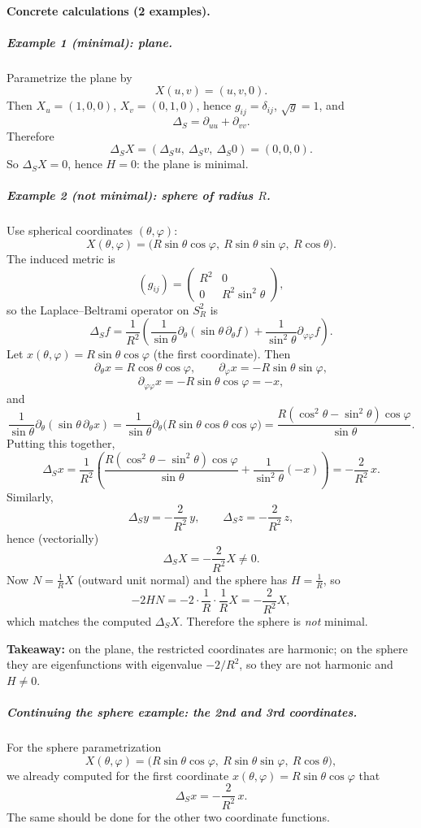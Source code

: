 \documentclass[12pt,a4paper]{article}
\theoremstyle{plain}
\theoremstyle{definition}      %
\begin{document}
\bigskip
\paragraph{Concrete calculations (2 examples).}

\subparagraph{Example 1 (minimal): plane.}
Parametrize the plane by
\[
X(u,v)=(u,v,0).
\]
Then $X_u=(1,0,0)$, $X_v=(0,1,0)$, hence $g_{ij}=\delta_{ij}$, $\sqrt{g}=1$, and
\[
\Delta_S=\partial_{uu}+\partial_{vv}.
\]
Therefore
\[
\Delta_S X = (\Delta_S u,\ \Delta_S v,\ \Delta_S 0)=(0,0,0).
\]
So $\Delta_S X=0$, hence $H=0$: the plane is minimal.

\subparagraph{Example 2 (not minimal): sphere of radius $R$.}
Use spherical coordinates $(\theta,\varphi)$:
\[
X(\theta,\varphi)=\bigl(R\sin\theta\cos\varphi,\ R\sin\theta\sin\varphi,\ R\cos\theta\bigr).
\]
The induced metric is
\[
(g_{ij})=\begin{pmatrix}R^2&0\\[2pt]0&R^2\sin^2\theta\end{pmatrix},
\]
so the Laplace--Beltrami operator on $S_R^2$ is
\[
\Delta_S f=\frac{1}{R^2}\left(\frac{1}{\sin\theta}\partial_\theta(\sin\theta\,\partial_\theta f)
+\frac{1}{\sin^2\theta}\partial_{\varphi\varphi} f\right).
\]
Let $x(\theta,\varphi)=R\sin\theta\cos\varphi$ (the first coordinate). Then
\[
\partial_\theta x=R\cos\theta\cos\varphi,\qquad
\partial_\varphi x=-R\sin\theta\sin\varphi,
\]
\[
\partial_{\varphi\varphi}x=-R\sin\theta\cos\varphi=-x,
\]
and
\[
\frac{1}{\sin\theta}\partial_\theta(\sin\theta\,\partial_\theta x)
=\frac{1}{\sin\theta}\partial_\theta\bigl(R\sin\theta\cos\theta\cos\varphi\bigr)
=\frac{R(\cos^2\theta-\sin^2\theta)\cos\varphi}{\sin\theta}.
\]
Putting this together,
\[
\Delta_S x
=\frac{1}{R^2}\left(\frac{R(\cos^2\theta-\sin^2\theta)\cos\varphi}{\sin\theta}
+\frac{1}{\sin^2\theta}(-x)\right)
=-\frac{2}{R^2}\,x.
\]
Similarly,
\[
\Delta_S y=-\frac{2}{R^2}\,y,\qquad \Delta_S z=-\frac{2}{R^2}\,z,
\]
hence (vectorially)
\[
\Delta_S X=-\frac{2}{R^2}X\neq 0.
\]
Now $N=\frac{1}{R}X$ (outward unit normal) and the sphere has $H=\frac{1}{R}$, so
\[
-2HN=-2\cdot\frac{1}{R}\cdot \frac{1}{R}X=-\frac{2}{R^2}X,
\]
which matches the computed $\Delta_S X$. Therefore the sphere is \emph{not} minimal.

\medskip
\textbf{Takeaway:} on the plane, the restricted coordinates are harmonic; on the sphere they are eigenfunctions
with eigenvalue $-2/R^2$, so they are not harmonic and $H\neq 0$.

\subparagraph{Continuing the sphere example: the 2nd and 3rd coordinates.}
For the sphere parametrization
\[
X(\theta,\varphi)=\bigl(R\sin\theta\cos\varphi,\ R\sin\theta\sin\varphi,\ R\cos\theta\bigr),
\]
we already computed for the first coordinate $x(\theta,\varphi)=R\sin\theta\cos\varphi$ that
\[
\Delta_S x=-\frac{2}{R^2}\,x.
\]
The same should be done for the other two coordinate functions.
\end{document}
